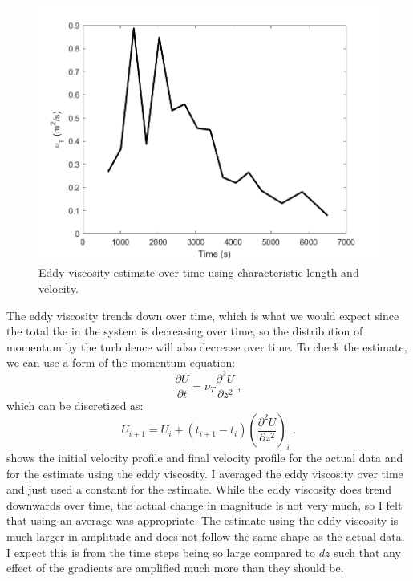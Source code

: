 \documentclass[11pt]{article}
\begin{document}
\begin{enumerate}
	\begin{figure}[htbp]
		\centering
		\includegraphics[width=\textwidth]{1-plots/char_nuT_plot.png}
		\caption{Eddy viscosity estimate over time using characteristic length and velocity.}
		\label{fig:nuT}
	\end{figure}
	The eddy viscosity trends down over time, which is what we would expect since the total tke in the system is decreasing over time, so the distribution of momentum by the turbulence will also decrease over time. To check the estimate, we can use a form of the momentum equation:
	\begin{equation}
		\frac{\partial U}{\partial t} = \nu_T \frac{\partial^2 U}{\partial z^2}\:,
	\end{equation}
	which can be discretized as:
	\begin{equation}
		U_{i+1} = U_{i} + \left( t_{i+1} - t_{i} \right) \left( \frac{\partial^2 U}{\partial z^2} \right)_{i}\:.
	\end{equation}
	 shows the initial velocity profile and final velocity profile for the actual data and for the estimate using the eddy viscosity. I averaged the eddy viscosity over time and just used a constant for the estimate. While the eddy viscosity does trend downwards over time, the actual change in magnitude is not very much, so I felt that using an average was appropriate. The estimate using the eddy viscosity is much larger in amplitude and does not follow the same shape as the actual data. I expect this is from the time steps being so large compared to $dz$ such that any effect of the gradients are amplified much more than they should be.
	

\end{enumerate}
\end{document}

